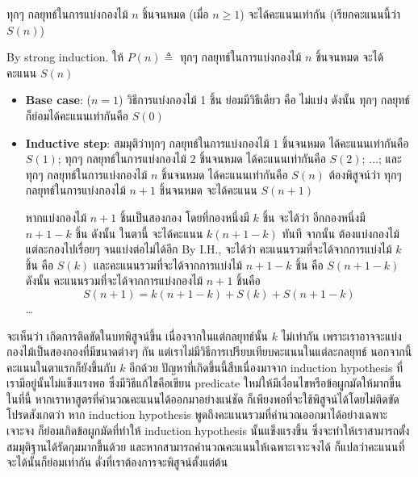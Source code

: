 \begin{theorem}
ทุกๆ กลยุทธ์ในการแบ่งกองไม้ $n$ ชิ้นจนหมด (เมื่อ $n\geq 1$) จะได้คะแนนเท่ากัน (เรียกคะแนนนี้ว่า $S(n)$)
\begin{pf}
By strong induction.  ให้ $P(n)\triangleq$ ทุกๆ กลยุทธ์ในการแบ่งกองไม้ $n$ ชิ้นจนหมด จะได้คะแนน $S(n)$
\begin{itemize}
\item {\bf Base case}: ($n=1$) \quad วิธีการแบ่งกองไม้ 1 ชิ้น ย่อมมีวิธีเดียว คือ ไม่แบ่ง ดังนั้น ทุกๆ กลยุทธ์ก็ย่อมได้คะแนนเท่ากันคือ $S(0)$ \quad\yea
\item {\bf Inductive step}: สมมุติว่าทุกๆ กลยุทธ์ในการแบ่งกองไม้ $1$ ชิ้นจนหมด ได้คะแนนเท่ากันคือ $S(1)$; ทุกๆ กลยุทธ์ในการแบ่งกองไม้ $2$ ชิ้นจนหมด ได้คะแนนเท่ากันคือ $S(2)$; $\ldots$; และทุกๆ กลยุทธ์ในการแบ่งกองไม้ $n$ ชิ้นจนหมด ได้คะแนนเท่ากันคือ $S(n)$ \enskip ต้องพิสูจน์ว่า ทุกๆ กลยุทธ์ในการแบ่งกองไม้ $n+1$ ชิ้นจนหมด จะได้คะแนน $S(n+1)$

หากแบ่งกองไม้ $n+1$ ชิ้นเป็นสองกอง โดยที่กองหนึ่งมี $k$ ชิ้น จะได้ว่า อีกกองหนึ่งมี $n+1-k$ ชิ้น ดังนั้น ในตานี้ จะได้คะแนน $k(n+1-k)$ ทันที จากนั้น ต้องแบ่งกองไม้แต่ละกองไปเรื่อยๆ จนแบ่งต่อไม่ได้อีก \enskip By I.H., จะได้ว่า คะแนนรวมที่จะได้จากการแบ่งไม้ $k$ ชิ้น คือ $S(k)$ และคะแนนรวมที่จะได้จากการแบ่งไม้ $n+1-k$ ชิ้น คือ $S(n+1-k)$ ดังนั้น คะแนนรวมที่จะได้จากการแบ่งกองไม้ $n+1$ ชิ้นคือ \[S(n+1)=k(n+1-k)+S(k)+S(n+1-k)\] \ldots
\end{itemize}
\end{pf}

จะเห็นว่า เกิดการติดขัดในบทพิสูจน์ขึ้น เนื่องจากในแต่กลยุทธ์นั้น $k$ ไม่เท่ากัน เพราะเราอาจจะแบ่งกองไม้เป็นสองกองที่มีขนาดต่างๆ กัน แต่เราไม่มีวิธีการเปรียบเทียบคะแนนในแต่ละกลยุทธ์ นอกจากนี้ คะแนนในตาแรกก็ยังขึ้นกับ $k$ อีกด้วย \enskip ปัญหาที่เกิดขึ้นนี้สืบเนื่องมาจาก induction hypothesis ที่เรามีอยู่นั้นไม่แข็งแรงพอ ซึ่งมีวิธีแก้ไขคือเขียน predicate ใหม่ให้มีเงื่อนไขหรือข้อผูกมัดให้มากขึ้น \enskip ในที่นี้ หากเราหาสูตรที่คำนวณคะแนนได้ออกมาอย่างแน่ชัด ก็เพียงพอที่จะใช้พิสูจน์ได้โดยไม่ติดขัด \enskip โปรดสังเกตว่า หาก induction hypothesis พูดถึงคะแนนรวมที่คำนวณออกมาได้อย่างเฉพาะเจาะจง ก็ย่อมเกิดข้อผูกมัดที่ทำให้ induction hypothesis นั้นแข็งแรงขึ้น ซึ่งจะทำให้เราสามารถตั้งสมมุติฐานได้รัดกุมมากขึ้นด้วย และหากสามารถคำนวณคะแนนให้เฉพาะเจาะจงได้ ก็แปลว่าคะแนนที่จะได้นั้นก็ย่อมเท่ากัน ดั่งที่เราต้องการจะพิสูจน์ตั้งแต่ต้น
\end{theorem}


